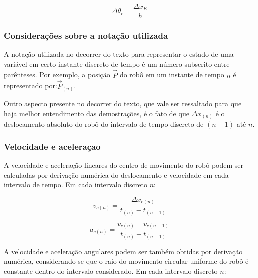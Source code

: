 \begin{equation}
  \Delta \theta_c = \frac{\Delta x_E}{h}
  \label{eq:caso_especial2_theta2}
\end{equation}

\subsubsection{Considerações sobre a notação utilizada}

A notação utilizada no decorrer do texto para representar o estado de uma variável em certo instante discreto de tempo é um número subscrito entre parênteses. Por exemplo, a posição $\overrightarrow{P}$ do robô em um instante de tempo $n$ é representado por:$\overrightarrow{P}_{(n)}$. 

Outro aspecto presente no decorrer do texto, que vale ser ressaltado para que haja melhor entendimento das demostrações, é o fato de que $\Delta x_{(n)}$ é o deslocamento absoluto do robô do intervalo de tempo discreto de $(n-1)$ até $n$.

%

\subsubsection{Velocidade e aceleraçao}

A velocidade e aceleração lineares do centro de movimento do robô podem ser calculadas por derivação numérica do deslocamento e velocidade em cada intervalo de tempo. Em cada intervalo discreto $n$:

\begin{equation}
  v_{c (n)} = \frac{\Delta x_{c (n)} }{t_{(n)} - t_{(n-1)}}
  \label{eq:velocidade_encoders}
\end{equation}

\begin{equation}
  a_{c (n)} = \frac{v_{c (n)} - v_{c (n-1)}}{t_{(n)} - t_{(n-1)}}
  \label{eq:aceleracao_encoders}
\end{equation}


A velocidade e aceleração angulares podem ser também obtidas por derivação numérica, considerando-se que o raio do movimento circular uniforme do robô é constante dentro do intervalo considerado. Em cada intervalo discreto $n$:

